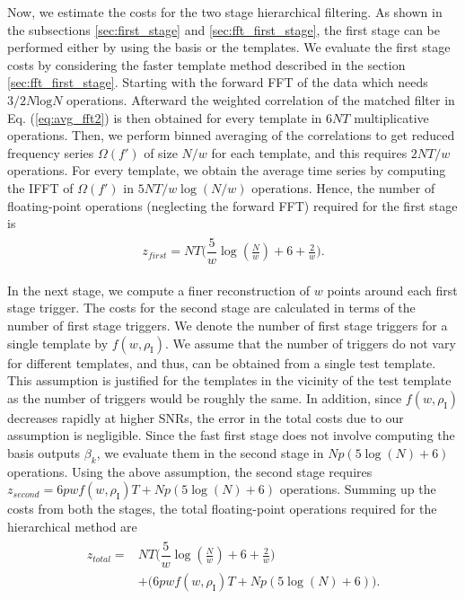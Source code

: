 Now, we estimate the costs for the two stage hierarchical filtering. As shown in the subsections \ref{sec:first_stage} and \ref{sec:fft_first_stage}, the first stage can be performed either by using the basis or the templates. We evaluate the first stage costs by considering the faster template method described in the section \ref{sec:fft_first_stage}. Starting with the forward FFT of the data which needs $3/2N\text{log}N$ operations. Afterward the weighted correlation of the matched filter in Eq. (\ref{eq:avg_fft2}) is then obtained for every template in $6NT$ multiplicative operations. Then, we perform binned averaging of the correlations to get reduced frequency series $\Omega(f')$ of size $N/w$ for each template, and this requires $2NT/w$ operations. For every template, we obtain the average time series by computing the IFFT of $\Omega(f')$ in $5NT/w\log (N/w)$ operations. Hence, the number of floating-point operations (neglecting the forward FFT) required for the first stage is 
\begin{align}
    \begin{split}
    \label{first_stage_cost}
        z_{first} = NT\Bigg(\dfrac{5}{w}\log(\frac{N}{w}) + 6 + \frac{2}{w}\Bigg).
    \end{split}
\end{align}


In the next stage, we compute a finer reconstruction of $w$ points around each first stage trigger. The costs for the second stage are calculated in terms of the number of first stage triggers. We denote the number of first stage triggers for a single template by $f(w, \rho_{\text{I}})$. We assume that the number of triggers do not vary for different templates, and thus, can be obtained from a single test template. This assumption is justified for the templates in the vicinity of the test template as the number of triggers would be roughly the same. In addition, since $f(w, \rho_{\text{I}})$ decreases rapidly at higher SNRs, the error in the total costs due to our assumption is negligible. Since the fast first stage does not involve computing the basis outputs $\beta_k$, we evaluate them in the second stage in $Np(5\log(N) + 6)$ operations. Using the above assumption, the second stage requires $z_{second} = 6pwf(w,\rho_{\text{I}})T + Np(5\log(N)+6)$ operations. Summing up the costs from both the stages, the total floating-point operations required for the hierarchical method are
\begin{align}
    \begin{split}
    \label{final_cost}
    z_{total} = & NT\Bigg(\dfrac{5}{w} \log(\frac{N}{w}) + 6 + \frac{2}{w}\Bigg) \\
         & + \Big( 6pw f(w, \rho_{\text{I}})T + Np(5\log(N) + 6)\Big).
    \end{split}
\end{align}

